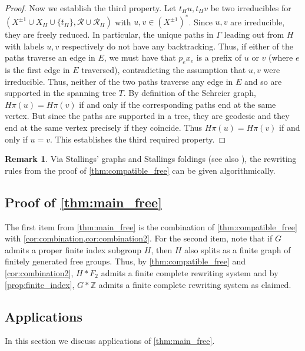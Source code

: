 \documentclass[12pt, a4paper]{amsart}
\theoremstyle{definition}
\newtheorem{remark}[theorem]{Remark}
\newcommand{\Z}{\mathbb{Z}}
\begin{document}
\begin{proof}
Now we establish the third property. Let $t_{H}u, t_{H}v$ be two irreducibles for $(X^{\pm1}\cup X_{H}\cup \{t_H\}, \mathcal{R}\cup \mathcal{R}_H)$ with $u, v\in (X^{\pm1})^*$. Since $u, v$ are irreducible, they are freely reduced. In particular, the unique paths in $\Gamma$ leading out from $H$ with labels $u, v$ respectively do not have any backtracking. Thus, if either of the paths traverse an edge in $E$, we must have that $p_ex_e$ is a prefix of $u$ or $v$ (where $e$ is the first edge in $E$ traversed), contradicting the assumption that $u, v$ were irreducible. Thus, neither of the two paths traverse any edge in $E$ and so are supported in the spanning tree $T$. By definition of the Schreier graph, $H\pi(u) = H\pi(v)$ if and only if the corresponding paths end at the same vertex. But since the paths are supported in a tree, they are geodesic and they end at the same vertex precisely if they coincide. Thus $H\pi(u) = H\pi(v)$ if and only if $u = v$. This establishes the third required property.
\end{proof}

\begin{remark}
\label{rem:algorithmic}
Via Stallings' graphs and Stallings foldings \cite{St83} (see also \cite{KM02}), the rewriting rules from the proof of \cref{thm:compatible_free} can be given algorithmically.
\end{remark}

\subsection{Proof of \cref{thm:main_free}}

The first item from \cref{thm:main_free} is the combination of \cref{thm:compatible_free} with \cref{cor:combination,cor:combination2}. For the second item, note that if $G$ admits a proper finite index subgroup $H$, then $H$ also splits as a finite graph of finitely generated free groups. Thus, by \cref{thm:compatible_free} and \cref{cor:combination2}, $H*F_2$ admits a finite complete rewriting system and by \cref{prop:finite_index}, $G*\Z$ admits a finite complete rewriting system as claimed.



\subsection{Applications}

In this section we discuss applications of \cref{thm:main_free}.
\end{document}
